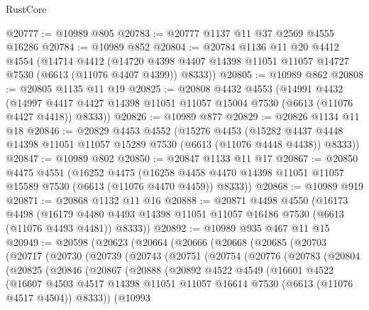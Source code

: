 \begin{lexlean}{RustCore}
\begin{coremodule}
@20777 := @10989 @805
@20783 := @20777 @1137 @11 @37 @2569 @4555 @16286
@20784 := @10989 @852
@20804 := @20784
    @1136
    @11
    @20
    @4412
    @4554
    (@14714
      @4412
      (@14720 @4398 @4407 @14398 @11051 @11057 @14727 @7530 (@6613 (@11076 @4407 @4399)) @8333))
@20805 := @10989 @862
@20808 := @20805 @1135 @11 @19
@20825 := @20808
    @4432
    @4553
    (@14991
      @4432
      (@14997 @4417 @4427 @14398 @11051 @11057 @15004 @7530 (@6613 (@11076 @4427 @4418)) @8333))
@20826 := @10989 @877
@20829 := @20826 @1134 @11 @18
@20846 := @20829
    @4453
    @4552
    (@15276
      @4453
      (@15282 @4437 @4448 @14398 @11051 @11057 @15289 @7530 (@6613 (@11076 @4448 @4438)) @8333))
@20847 := @10989 @802
@20850 := @20847 @1133 @11 @17
@20867 := @20850
    @4475
    @4551
    (@16252
      @4475
      (@16258 @4458 @4470 @14398 @11051 @11057 @15589 @7530 (@6613 (@11076 @4470 @4459)) @8333))
@20868 := @10989 @919
@20871 := @20868 @1132 @11 @16
@20888 := @20871
    @4498
    @4550
    (@16173
      @4498
      (@16179 @4480 @4493 @14398 @11051 @11057 @16186 @7530 (@6613 (@11076 @4493 @4481)) @8333))
@20892 := @10989 @935 @467 @11 @15
@20949 := @20598
    (@20623
      (@20664
        (@20666
          (@20668
            (@20685
              (@20703
                (@20717
                  (@20730
                    (@20739
                      (@20743
                        (@20751
                          (@20754
                            (@20776
                              (@20783
                                (@20804
                                  (@20825
                                    (@20846
                                      (@20867
                                        (@20888
                                          (@20892
                                            @4522
                                            @4549
                                            (@16601
                                              @4522
                                              (@16607
                                                @4503
                                                @4517
                                                @14398
                                                @11051
                                                @11057
                                                @16614
                                                @7530
                                                (@6613 (@11076 @4517 @4504))
                                                @8333))
                                            (@10993

\end{coremodule}
\end{lexlean}
